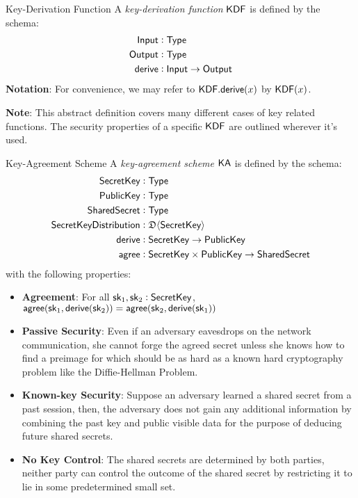 \begin{definitiontoc}{Key-Derivation Function}
    A \emph{key-derivation function} ${\textsf{KDF}}$ is defined by the schema:
    \begin{align*}
        {\textsf{Input}}  &: {\textsf{Type}} \\
        {\textsf{Output}} &: {\textsf{Type}} \\
        {\textsf{derive}} &: {\textsf{Input}} \to {\textsf{Output}}
    \end{align*}
    \textbf{Notation}: For convenience, we may refer to ${\textsf{KDF}}.{\textsf{derive}}(x)$ by ${\textsf{KDF}}(x)$.

    \textbf{Note}: This abstract definition covers many different cases of key related functions. The security properties of a specific ${\textsf{KDF}}$ are outlined wherever it's used.
\end{definitiontoc}

\begin{definitiontoc}{Key-Agreement Scheme}
    A \emph{key-agreement scheme} ${\textsf{KA}}$ is defined by the schema:
    \begin{align*}
        {\textsf{SecretKey}}    &: {\textsf{Type}} \\
        {\textsf{PublicKey}}    &: {\textsf{Type}} \\
        {\textsf{SharedSecret}} &: {\textsf{Type}} \\
        {\textsf{SecretKeyDistribution}} &: \mathfrak{D}\langle{{\textsf{SecretKey}}}\rangle \\
        {\textsf{derive}}       &: {\textsf{SecretKey}} \to {\textsf{PublicKey}} \\
        {\textsf{agree}}        &: {\textsf{SecretKey}} \times {\textsf{PublicKey}} \to {\textsf{SharedSecret}}
    \end{align*}
    with the following properties:
    \begin{itemize}
        \item \textbf{Agreement}: For all ${\textsf{sk}}_1, {\textsf{sk}}_2 : {\textsf{SecretKey}}$, ${\textsf{agree}}({\textsf{sk}}_1, {\textsf{derive}}({\textsf{sk}}_2)) = {\textsf{agree}}({\textsf{sk}}_2, {\textsf{derive}}({\textsf{sk}}_1))$
        \item \textbf{Passive Security}: Even if an adversary eavesdrops on the network communication, she cannot forge the agreed secret unless she knows how to find a preimage for \derive{} which should be as hard as a known hard cryptography problem like the Diffie-Hellman Problem.
        \item \textbf{Known-key Security}: Suppose an adversary learned a shared secret from a past session, then, the adversary does not gain any additional information by combining the past key and public visible data for the purpose of deducing future shared secrets.
        \item \textbf{No Key Control}: The shared secrets are determined by both parties, neither party can control the outcome of the shared secret by restricting it to lie in some predetermined small set.
    \end{itemize}
\end{definitiontoc}

